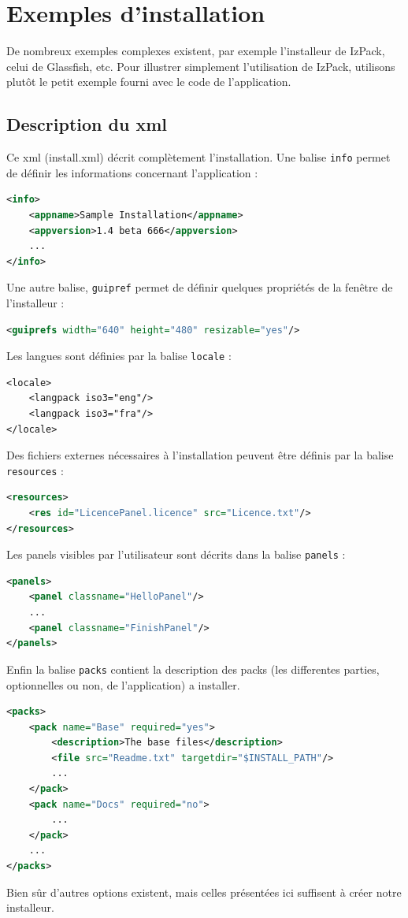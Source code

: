 \section{Exemples d'installation}
De nombreux exemples complexes existent, par exemple l'installeur de IzPack, celui de Glassfish, etc. Pour illustrer simplement l'utilisation de IzPack, utilisons plutôt le petit exemple fourni avec le code de l'application.

\subsection{Description du xml}


Ce xml (install.xml) décrit complètement l'installation.
Une balise \verb|info| permet de définir les informations concernant l'application : 
\begin{lstlisting}[language=xml]
<info>
	<appname>Sample Installation</appname>
	<appversion>1.4 beta 666</appversion>
	...
</info>
\end{lstlisting}
Une autre balise, \verb|guipref| permet de définir quelques propriétés de la fenêtre de l'installeur :
\begin{lstlisting}[language=xml]
<guiprefs width="640" height="480" resizable="yes"/>
\end{lstlisting}
Les langues sont définies par la balise \verb|locale| :
\begin{lstlisting}
<locale>
	<langpack iso3="eng"/>
	<langpack iso3="fra"/>
</locale>
\end{lstlisting}
Des fichiers externes nécessaires à l'installation peuvent être définis par la balise \verb|resources| :

\begin{lstlisting}[language=xml]
<resources>
	<res id="LicencePanel.licence" src="Licence.txt"/>
</resources>
\end{lstlisting}
Les panels visibles par l'utilisateur sont décrits dans la balise \verb|panels| :
\begin{lstlisting}[language=xml]
<panels>
	<panel classname="HelloPanel"/>
	...
	<panel classname="FinishPanel"/>
</panels>
\end{lstlisting}
Enfin la balise \verb|packs| contient la description des packs (les differentes parties, optionnelles ou non, de l'application) a installer.
\begin{lstlisting}[language=xml]
<packs>
	<pack name="Base" required="yes">
		<description>The base files</description>
		<file src="Readme.txt" targetdir="$INSTALL_PATH"/>
		...
	</pack>
	<pack name="Docs" required="no">
		...
	</pack>
	...
</packs>
\end{lstlisting}
Bien sûr d'autres options existent, mais celles présentées ici suffisent à créer notre installeur.
